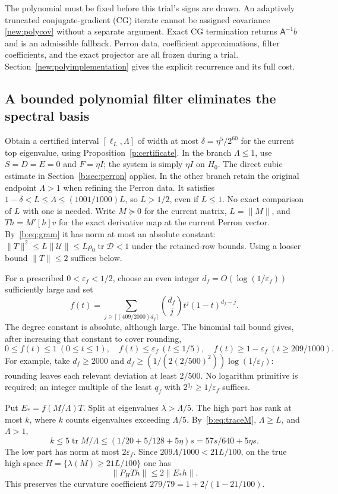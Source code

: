 \documentclass[11pt]{amsart}
\theoremstyle{definition}\newtheorem{definition}[theorem]{Definition}
\theoremstyle{remark}\newtheorem{remark}[theorem]{Remark}
\numberwithin{equation}{section}
\newcommand{\tr}{\operatorname{tr}}
\begin{document}
The polynomial must be fixed before this trial's signs are drawn. An
adaptively truncated conjugate-gradient (CG) iterate cannot be assigned covariance
\eqref{new:polycov} without a separate argument. Exact CG termination
returns $\mathsf A^{-1}b$ and is an admissible fallback. Perron data,
coefficient approximations, filter coefficients, and the exact projector
are all frozen during a trial. Section~\ref{new:polyimplementation}
gives the explicit recurrence and its full cost.


\subsection{A bounded polynomial filter eliminates the spectral basis}\label{r:filter}
Obtain a certified interval $[\ell_L,\Lambda]$ of width at most
$\delta=\eta^5/2^{60}$ for the current top eigenvalue, using
Proposition~\ref{p:certificate}. In the branch $\Lambda\le1$, use
$S=D=E=0$ and $F=\eta I$; the system is simply $\eta I$ on $H_0$.
The direct cubic estimate in Section~\ref{b:sec:perron} applies.
In the other branch retain the original endpoint $\Lambda>1$ when refining
the Perron data. It satisfies $1-\delta<L\le\Lambda\le(1001/1000)L$,
so $L>1/2$, even if $L\le1$. No exact comparison of $L$ with one is needed.
Write $M\succeq0$ for the current matrix, $L=\|M\|$, and
$T h=M'[h]v$ for the exact derivative map at the current Perron vector. By~\eqref{b:eq:gram} it has norm at most an absolute constant: $\|T\|^2\le L\|\mathcal U\|\le
L\rho_0\tr\mathcal D<1$ under the retained-row bounds.
Using a looser bound $\|T\|\le2$ suffices below.

For a prescribed $0<\varepsilon_f<1/2$, choose an even integer
$d_f=O(\log(1/\varepsilon_f))$ sufficiently large and set
\[
 f(t)=\sum_{j\ge\lceil(409/2000)d_f\rceil}
          \binom{d_f}{j}t^j(1-t)^{d_f-j}.
\]
The degree constant is absolute, although large. The binomial tail bound
gives, after increasing that constant to cover rounding,
\[
 0\le f(t)\le1\ (0\le t\le1),\quad
 f(t)\le\varepsilon_f\ (t\le1/5),\quad
 f(t)\ge1-\varepsilon_f\ (t\ge209/1000).
\]
For example, take $d_f\ge2000$ and
$d_f\ge (1/(2(2/500)^2))\log(1/\varepsilon_f)$:
rounding leaves each relevant deviation at least $2/500$.
No logarithm primitive is required; an integer multiple of the least
$q_f$ with $2^{q_f}\ge1/\varepsilon_f$ suffices.

Put $E_*=f(M/\Lambda)T$. Split at eigenvalues $\lambda>\Lambda/5$.
The high part has rank at most $k$, where $k$ counts eigenvalues
exceeding $\Lambda/5$. By~\eqref{b:eq:traceM}, $\Lambda\ge L$, and
$\Lambda>1$,
\[
 k\le5\tr M/\Lambda
 \le(1/20+5/128+5\eta)s
 =57s/640+5\eta s.
\]
The low part has norm at most $2\varepsilon_f$.
Since $209\Lambda/1000<21L/100$, on the true high space
$H=\{\lambda(M)\ge21L/100\}$ one has
\begin{equation}\label{r:true-leakage}
 \|P_HTh\|\le2\|E_*h\|.
\end{equation}
This preserves the curvature coefficient $279/79=1+2/(1-21/100)$.
\end{document}
